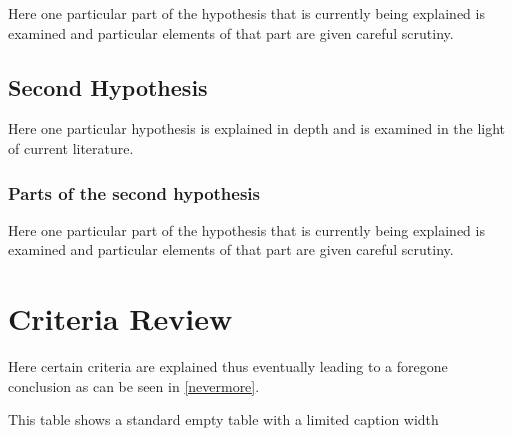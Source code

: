 Here one particular part of the hypothesis that is 
currently being explained is examined and particular
elements of that part are given careful scrutiny.


\subsection{Second Hypothesis}

Here one particular hypothesis is explained in depth
and is examined in the light of current literature.

\subsubsection{Parts of the second hypothesis}

Here one particular part of the hypothesis that is 
currently being explained is examined and particular
elements of that part are given careful scrutiny.

\section{Criteria Review}

Here certain criteria are explained thus eventually
leading to a foregone conclusion as can be seen in
\autoref{nevermore}.

\begin{table}[h!tb] \centering
\captionsetup{width=2in}
\caption{This table shows a standard empty table with a limited caption width}
\label{nevermore}

\vspace{ 2 in}
\end{table}

